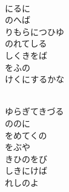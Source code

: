 \documentclass[10pt,b5j]{tarticle} %
\begin{document}
\begin{enumerate}
\begin{minipage}[c]{\blocksize}
    \end{minipage}
    \begin{minipage}[c]{\blocksize}
        
        \vspace{\linespace}
        \item~\\
        にるに\\
        のへば\\
        りもらにつひゆ\\
        のれてしる\\
        しくきをば\\
        をふの\\
        けくにするかな
        
    \end{minipage}
    \begin{minipage}[c]{\blocksize}
        
        \vspace{\linespace}
        \item~\\
        ゆらぎてきづる\\
        ののに\\
        をめてくの\\
        をぶや\\
        きひのをび\\
        しきにけば\\
        れしのよ
        
    \end{minipage}
    \begin{minipage}[c]{\blocksize}
        

\end{minipage}
\end{enumerate}
\end{document}
